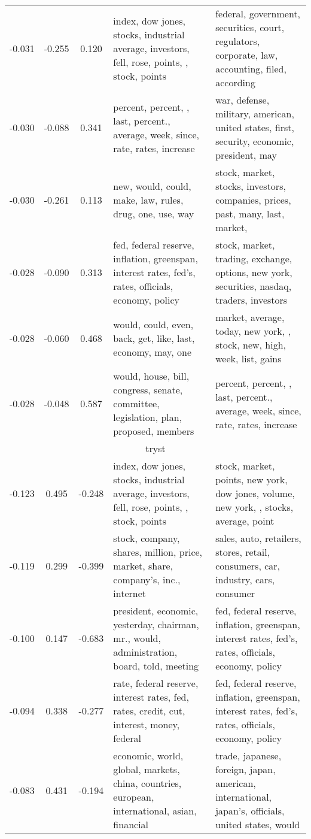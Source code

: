 \begin{tabular}{cccp{5cm}p{5cm}}
-0.031 & -0.255 & 0.120 & index, dow jones, stocks, industrial average, investors, fell, rose, points, , stock, points & federal, government, securities, court, regulators, corporate, law, accounting, filed, according \\
-0.030 & -0.088 & 0.341 & percent, percent, , last, percent., average, week, since, rate, rates, increase & war, defense, military, american, united states, first, security, economic, president, may \\
-0.030 & -0.261 & 0.113 & new, would, could, make, law, rules, drug, one, use, way & stock, market, stocks, investors, companies, prices, past, many, last, market,  \\
-0.028 & -0.090 & 0.313 & fed, federal reserve, inflation, greenspan, interest rates, fed's, rates, officials, economy, policy & stock, market, trading, exchange, options, new york, securities, nasdaq, traders, investors \\
-0.028 & -0.060 & 0.468 & would, could, even, back, get, like, last, economy, may, one & market, average, today, new york, , stock, new, high, week, list, gains \\
-0.028 & -0.048 & 0.587 & would, house, bill, congress, senate, committee, legislation, plan, proposed, members & percent, percent, , last, percent., average, week, since, rate, rates, increase \\
\midrule
\multicolumn{5}{c}{tryst}\\
-0.123 & 0.495 & -0.248 & index, dow jones, stocks, industrial average, investors, fell, rose, points, , stock, points & stock, market, points, new york, dow jones, volume, new york, , stocks, average, point \\
-0.119 & 0.299 & -0.399 & stock, company, shares, million, price, market, share, company's, inc., internet & sales, auto, retailers, stores, retail, consumers, car, industry, cars, consumer \\
-0.100 & 0.147 & -0.683 & president, economic, yesterday, chairman, mr., would, administration, board, told, meeting & fed, federal reserve, inflation, greenspan, interest rates, fed's, rates, officials, economy, policy \\
-0.094 & 0.338 & -0.277 & rate, federal reserve, interest rates, fed, rates, credit, cut, interest, money, federal & fed, federal reserve, inflation, greenspan, interest rates, fed's, rates, officials, economy, policy \\
-0.083 & 0.431 & -0.194 & economic, world, global, markets, china, countries, european, international, asian, financial & trade, japanese, foreign, japan, american, international, japan's, officials, united states, would \\

\end{tabular}

